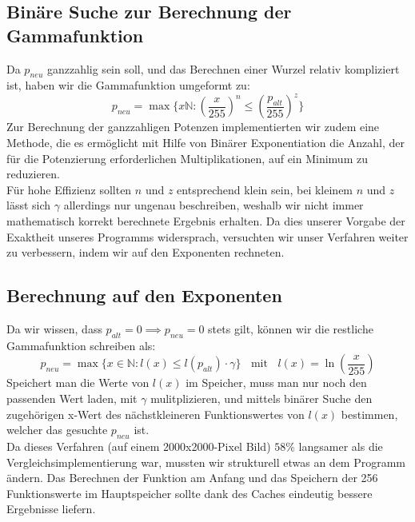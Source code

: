 \documentclass[course=erap]{aspdoc}
\begin{document}
	\subsection{Binäre Suche zur Berechnung der Gammafunktion}
	Da $p_{neu}$ ganzzahlig sein soll, und das Berechnen einer Wurzel relativ kompliziert ist, haben wir die Gammafunktion umgeformt zu:
	\begin{equation}
	\label{(5)}
	p_{neu} = \max \{ x \mathbb{N} :\left(\frac{x}{255}\right)^{n} \leq\left(\frac{p_{alt}}{255}\right)^{z} \}
	\end{equation}
	\noindent	
	Zur Berechnung der ganzzahligen Potenzen implementierten wir zudem eine Methode, die es ermöglicht mit Hilfe von Binärer Exponentiation die Anzahl, der für die Potenzierung erforderlichen Multiplikationen, auf ein Minimum zu reduzieren.\\
	
	\noindent		 
	Für hohe Effizienz sollten $n$ und $z$ entsprechend klein sein, bei kleinem $n$ und $z$ lässt sich $\gamma$ allerdings nur ungenau beschreiben, weshalb wir nicht immer mathematisch korrekt berechnete Ergebnis erhalten. Da dies unserer Vorgabe der Exaktheit unseres Programms widersprach, versuchten wir unser Verfahren weiter zu verbessern, indem wir auf den Exponenten rechneten.          
	
	\subsection{Berechnung auf den Exponenten}
	Da wir wissen, dass $p_{alt}=0 \implies p_{neu}=0$ stets gilt, können wir die restliche Gammafunktion schreiben als:
	\begin{equation}
	\label{(6)}
	    p_{neu} = \max\{x\in \mathbb{N} : l(x) \leq l(p_{alt}) \cdot \gamma\} \;\;\text{ mit } \;\; l(x) = \ln\left(\frac{x}{255}\right)
	\end{equation}
	Speichert man die Werte von $l(x)$ im Speicher, muss man nur noch den passenden Wert laden, mit $\gamma$ mulitplizieren, und mittels binärer Suche den zugehörigen x-Wert des nächstkleineren Funktionswertes von $l(x)$ bestimmen, welcher das gesuchte $p_{neu}$ ist.\\
	
	\noindent
	Da dieses Verfahren (auf einem 2000x2000-Pixel Bild) $58\%$ langsamer als die Vergleichsimplementierung war, mussten wir strukturell etwas an dem Programm ändern. Das Berechnen der Funktion am Anfang und das Speichern der 256 Funktionswerte im Hauptspeicher sollte dank des Caches eindeutig bessere Ergebnisse liefern.\\
	
\end{document}

